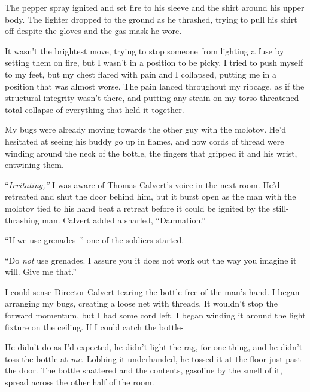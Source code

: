 The pepper spray ignited and set fire to his sleeve and the shirt around his upper body.  The lighter dropped to the ground as he thrashed, trying to pull his shirt off despite the gloves and the gas mask he wore.



It wasn't the brightest move, trying to stop someone from lighting a fuse by setting them on fire, but I wasn't in a position to be picky.  I tried to push myself to my feet, but my chest flared with pain and I collapsed, putting me in a position that was almost worse.  The pain lanced throughout my ribcage, as if the structural integrity wasn't there, and putting any strain on my torso threatened total collapse of everything that held it together.



My bugs were already moving towards the other guy with the molotov.  He'd hesitated at seeing his buddy go up in flames, and now cords of thread were winding around the neck of the bottle, the fingers that gripped it and his wrist, entwining them.



``\emph{Irritating,'' }I was aware of Thomas Calvert's voice in the next room.  He'd retreated and shut the door behind him, but it burst open as the man with the molotov tied to his hand beat a retreat before it could be ignited by the still-thrashing man.  Calvert added a snarled, ``Damnation.''



``If we use grenades--'' one of the soldiers started.



``Do \emph{not} use grenades.  I assure you it does not work out the way you imagine it will.  Give me that.''



I could sense Director Calvert tearing the bottle free of the man's hand.  I began arranging my bugs, creating a loose net with threads.  It wouldn't stop the forward momentum, but I had some cord left.  I began winding it around the light fixture on the ceiling.  If I could catch the bottle-



He didn't do as I'd expected, he didn't light the rag, for one thing, and he didn't toss the bottle at \emph{me}.  Lobbing it underhanded, he tossed it at the floor just past the door.  The bottle shattered and the contents, gasoline by the smell of it, spread across the other half of the room.



